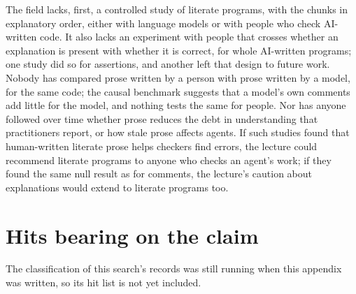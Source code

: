 The field lacks, first, a controlled study of literate programs, with the
chunks in explanatory order, either with language models or with people who
check AI-written code.
It also lacks an experiment with people that crosses whether an explanation is
present with whether it is correct, for whole AI-written programs; one study
did so for assertions\autocite{kaufman2026assertions}, and another left that
design to future work\autocite{gao2026xai}.
Nobody has compared prose written by a person with prose written by a model,
for the same code; the causal benchmark suggests that a model's own comments
add little for the model\autocite{pan2026talking}, and nothing tests the same
for people.
Nor has anyone followed over time whether prose reduces the debt in
understanding that practitioners report, or how stale prose affects agents.
If such studies found that human-written literate prose helps checkers find
errors, the lecture could recommend literate programs to anyone who checks an
agent's work; if they found the same null result as for comments, the lecture's
caution about explanations would extend to literate programs too.

\section{Hits bearing on the claim}
\label{sec:ai-rq23-hits}

The classification of this search's records was still running when this
appendix was written, so its hit list is not yet included.

